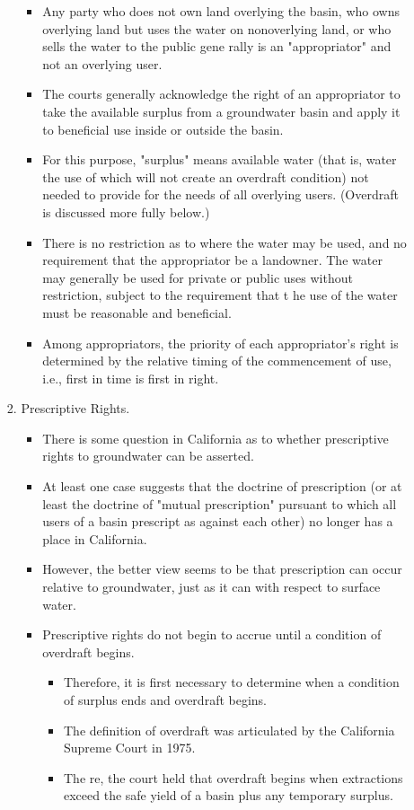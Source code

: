 \documentclass{article}
\begin{document}
\begin{enumerate}
\begin{itemize}
\begin{enumerate}
\begin{itemize}
\item Any party who does not own land overlying the basin, who owns overlying land but uses the water on nonoverlying land, or who sells the water to the public gene rally is an "appropriator" and not an overlying user. 
\item The courts generally acknowledge the right of an appropriator to take the available surplus from a groundwater basin and apply it to beneficial use inside or outside the basin. 
\item For this purpose, "surplus" means available water (that is, water the use of which will not create an overdraft condition) not needed to provide for the needs of all overlying users. (Overdraft is discussed more fully below.) 
\item There is no restriction as to where the water may be used, and no requirement that the appropriator be a landowner. The water may generally be used for private or public uses without restriction, subject to the requirement that t he use of the water must be reasonable and beneficial.
\item Among appropriators, the priority of each appropriator's right is determined by the relative timing of the commencement of use, i.e., first in time is first in right. 
\end{itemize}
\item Prescriptive Rights.\\
\begin{itemize}
\item There is some question in California as to whether prescriptive rights to groundwater can be asserted. 
\item At least one case suggests that the doctrine of prescription (or at least the doctrine of "mutual prescription" pursuant to which all users of a basin prescript as against each other) no longer has a place in California. 
\item However, the better view seems to be that prescription can occur relative to groundwater, just as it can with respect to surface water. 
\item Prescriptive rights do not begin to accrue until a condition of overdraft begins. 
\begin{itemize}
\item Therefore, it is first necessary to determine when a condition of surplus ends and overdraft begins. 
\item The definition of overdraft was articulated by the California Supreme Court in 1975. 
\item The re, the court held that overdraft begins when extractions exceed the safe yield of a basin plus any temporary surplus. 

\end{itemize}
\end{itemize}
\end{enumerate}
\end{itemize}
\end{enumerate}
\end{document}
